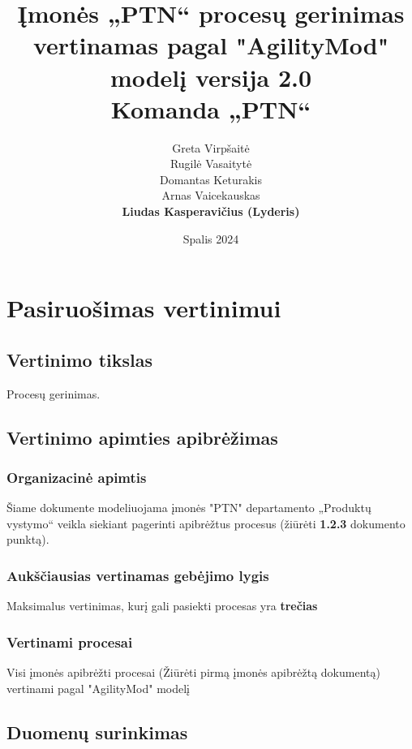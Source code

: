 \documentclass{article}
\title{
    Įmonės „PTN“ procesų gerinimas\\
    \large vertinamas pagal  "AgilityMod" modelį 
    \large versija 2.0 \\
    \large Komanda „PTN“}
\author{
    Greta Virpšaitė \\
    Rugilė Vasaitytė \\
    Domantas Keturakis \\
    Arnas Vaicekauskas \\
    \textbf{Liudas Kasperavičius (Lyderis)} 
}
\date{Spalis 2024}
\begin{document}


\maketitle

\newpage
\tableofcontents

\newpage

\section{Pasiruošimas vertinimui}

\subsection{Vertinimo tikslas}

Procesų gerinimas.

\subsection{Vertinimo apimties apibrėžimas}

\subsubsection{Organizacinė apimtis}
Šiame dokumente modeliuojama įmonės "PTN" departamento „Produktų vystymo“ veikla siekiant pagerinti apibrėžtus procesus (žiūrėti \textbf{1.2.3}  dokumento punktą).

\subsubsection{Aukščiausias vertinamas gebėjimo lygis}

Maksimalus vertinimas, kurį gali pasiekti procesas yra \textbf{trečias}

\subsubsection{Vertinami procesai}

Visi įmonės apibrėžti procesai (Žiūrėti pirmą įmonės apibrėžtą dokumentą) vertinami pagal "AgilityMod" modelį


\subsection{Duomenų surinkimas}
\end{document}
